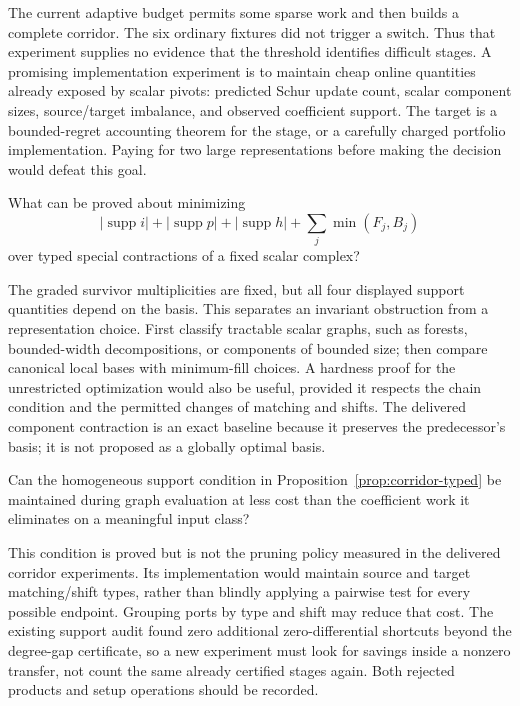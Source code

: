 The current adaptive budget permits some sparse work and then builds a
complete corridor. The six ordinary fixtures did not trigger a switch.
Thus that experiment supplies no evidence that the threshold identifies
difficult stages. A promising implementation experiment is to maintain
cheap online quantities already exposed by scalar pivots: predicted Schur
update count, scalar component sizes, source/target imbalance, and observed
coefficient support. The target is a bounded-regret accounting theorem for
the stage, or a carefully charged portfolio implementation. Paying for two
large representations before making the decision would defeat this goal.

\begin{researchquestion}
What can be proved about minimizing
\[
  |\operatorname{supp}i|+|\operatorname{supp}p|
  +|\operatorname{supp}h|+\sum_j\min(F_j,B_j)
\]
over typed special contractions of a fixed scalar complex?
\end{researchquestion}

The graded survivor multiplicities are fixed, but all four displayed
support quantities depend on the basis. This separates an invariant
obstruction from a representation choice. First classify tractable scalar
graphs, such as forests, bounded-width decompositions, or components of
bounded size; then compare canonical local bases with minimum-fill choices.
A hardness proof for the unrestricted optimization would also be useful,
provided it respects the chain condition and the permitted changes of
matching and shifts. The delivered component contraction is an exact
baseline because it preserves the predecessor's basis; it is not proposed
as a globally optimal basis.

\begin{researchquestion}
Can the homogeneous support condition in
Proposition~\ref{prop:corridor-typed} be maintained during graph evaluation
at less cost than the coefficient work it eliminates on a meaningful input
class?
\end{researchquestion}

This condition is proved but is not the pruning policy measured in the
delivered corridor experiments. Its implementation would maintain source
and target matching/shift types, rather than blindly applying a pairwise
test for every possible endpoint. Grouping ports by type and shift may
reduce that cost. The existing support audit found zero additional
zero-differential shortcuts beyond the degree-gap certificate, so a new
experiment must look for savings inside a nonzero transfer, not count the
same already certified stages again. Both rejected products and setup
operations should be recorded.

